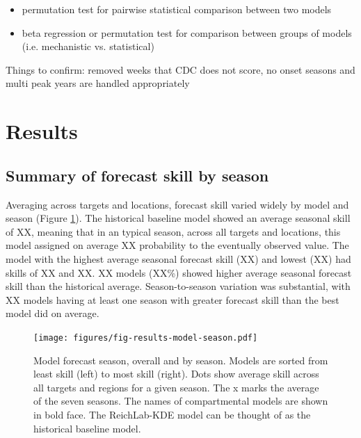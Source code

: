 \documentclass{article}\usepackage[]{graphicx}\usepackage[]{color}
\begin{document}
\begin{itemize}
    \item permutation test for pairwise statistical comparison between two models
    \item beta regression or permutation test for comparison between groups of models (i.e. mechanistic vs. statistical)
\end{itemize}

Things to confirm: removed weeks that CDC does not score, no onset seasons and multi peak years are handled appropriately

\section{Results}

\subsection{Summary of forecast skill by season}

Averaging across targets and locations, forecast skill varied widely by model and season (Figure \ref{fig:results-season}). 
The historical baseline model showed an average seasonal skill of XX, meaning that in an typical season, across all targets and locations, this model assigned on average XX probability to the eventually observed value. 
The model with the highest average seasonal forecast skill (XX) and lowest (XX) had skills of XX and XX. 
XX models (XX\%) showed higher average seasonal forecast skill than the historical average.
Season-to-season variation was substantial, with XX models having at least one season with greater forecast skill than the best model did on average.

\begin{figure}[htbp]
\begin{center}
\texttt{[image: figures/fig-results-model-season.pdf]}
\caption{Model forecast season, overall and by season. Models are sorted from least skill (left) to most skill (right). Dots show average skill across all targets and regions for a given season. The x marks the average of the seven seasons. The names of compartmental models are shown in bold face. The ReichLab-KDE model can be thought of as the historical baseline model.}
\label{fig:results-season}
\end{center}
\end{figure}
\end{document}
